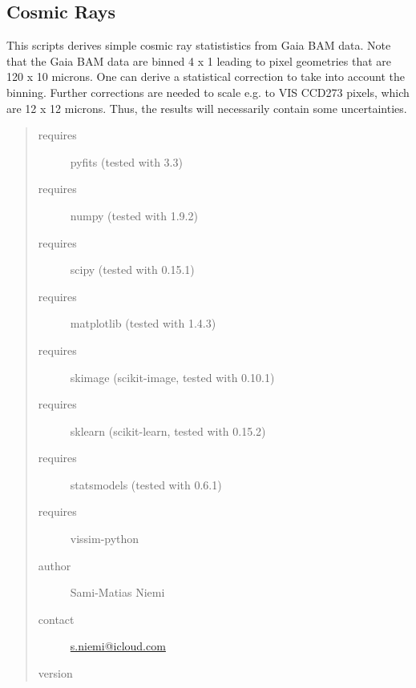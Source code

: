 \documentclass[a4paper,11pt,english]{sphinxmanual}
\begin{document}
\subsection{Cosmic Rays}
\label{analysis:cosmic-rays}
This scripts derives simple cosmic ray statististics from Gaia BAM data.
Note that the Gaia BAM data are binned 4 x 1 leading to pixel geometries
that are 120 x 10 microns. One can derive a statistical correction to
take into account the binning. Further corrections are needed to scale
e.g. to VIS CCD273 pixels, which are 12 x 12 microns. Thus, the results
will necessarily contain some uncertainties.
\begin{quote}\begin{description}
\item[{requires}] \leavevmode
pyfits (tested with 3.3)

\item[{requires}] \leavevmode
numpy (tested with 1.9.2)

\item[{requires}] \leavevmode
scipy (tested with 0.15.1)

\item[{requires}] \leavevmode
matplotlib (tested with 1.4.3)

\item[{requires}] \leavevmode
skimage (scikit-image, tested with 0.10.1)

\item[{requires}] \leavevmode
sklearn (scikit-learn, tested with 0.15.2)

\item[{requires}] \leavevmode
statsmodels (tested with 0.6.1)

\item[{requires}] \leavevmode
vissim-python

\item[{author}] \leavevmode
Sami-Matias Niemi

\item[{contact}] \leavevmode
\href{mailto:s.niemi@icloud.com}{s.niemi@icloud.com}

\item[{version}] 

\end{description}\end{quote}
\end{document}
